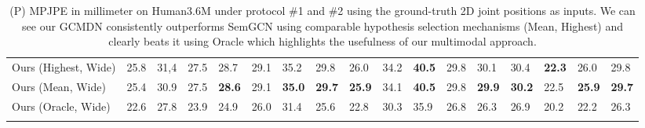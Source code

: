 \begin{table}
\begin{tabular}{lllllllllllllllll}
Ours (Highest, Wide) & 25.8 & 31,4 & 27.5 & 28.7 & 29.1 & 35.2 & 29.8 & 26.0 & 34.2 & \textbf{40.5} & 29.8 & 30.1 & 30.4 & \textbf{22.3} & 26.0 & 29.8 \\
Ours (Mean, Wide) & 25.4 & 30.9 & 27.5 & \textbf{28.6} & 29.1 & \textbf{35.0} & \textbf{29.7} & \textbf{25.9} & 34.1 & \textbf{40.5} & 29.8 & \textbf{29.9} & \textbf{30.2} & 22.5 & \textbf{25.9} & \textbf{29.7} \\ \hline
Ours (Oracle, Wide) & 22.6 & 27.8 & 23.9 & 24.9 & 26.0 & 31.4 & 25.6 & 22.8 & 30.3 & 35.9 & 26.8 & 26.3 & 26.9 & 20.2 & 22.2 & 26.3 \\
 &  &  &  &  &  &  &  &  &  &  &  &  &  &  &  & 
\end{tabular}
\caption{(P) MPJPE in millimeter on Human3.6M under protocol \#1 and \#2 using the ground-truth 2D joint positions as inputs. We can see our GCMDN consistently outperforms SemGCN using comparable hypothesis selection mechanisms (Mean, Highest) and clearly beats it using Oracle which highlights the usefulness of our multimodal approach.}
\label{tab:GT_ours_semgcn}

\end{table}

